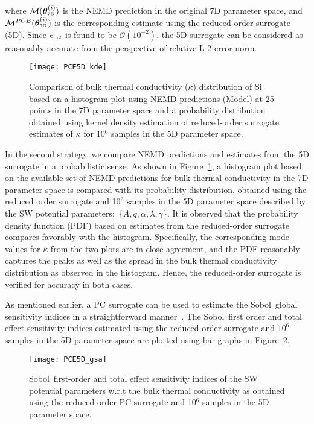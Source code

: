 \noindent where $\mathcal{M}(\bm{\theta}_{\mbox{\tiny{7D}}}^{(i)})$ is the NEMD prediction in the original 7D
parameter space, and $\mathcal{M}^{PCE}(\bm{\theta}_{\mbox{\tiny{5D}}}^{(i)})$ is the corresponding 
estimate using the reduced order surrogate (5D). 
Since $\epsilon_{\mbox{\tiny{L-2}}}$ is found to be $\mathcal{O}(10^{-2})$, the 5D surrogate can be considered as
reasonably accurate from the perspective of relative L-2 error norm. 

\begin{figure}[htbp]
 \begin{center}
  \texttt{[image: PCE5D\_kde]}
\caption{Comparison of bulk thermal conductivity ($\kappa$) distribution of Si based on a histogram plot
using NEMD predictions (Model) at 25 points in the 7D parameter space and a probability distribution obtained 
using kernel density estimation of  reduced-order surrogate estimates of $\kappa$ for 10$^6$ samples in the 5D
parameter space.}
\label{fig:verify}
\end{center}
\end{figure}

In the second strategy, we compare NEMD
predictions and estimates from the 5D surrogate in a probabilistic sense. As shown in Figure~\ref{fig:verify}, a 
histogram plot based on the available set of NEMD predictions for bulk thermal conductivity in the 7D parameter 
space is compared with its probability distribution, obtained using the reduced order surrogate and
10$^6$ samples in the 5D parameter space described by the SW potential parameters:~$\{A,q,\alpha,\lambda,\gamma\}$. It is observed that the probability density function (PDF) based on estimates from the reduced-order surrogate compares
favorably with the histogram. Specifically, the corresponding mode values for $\kappa$ from the two plots are
in close agreement, and the PDF reasonably captures the peaks as well as the spread in
the bulk thermal conductivity distribution as observed in the histogram. 
Hence, the reduced-order surrogate is verified for accuracy in both cases. 
\bigskip

As mentioned earlier, a PC surrogate can be used to estimate the Sobol\textquotesingle~global sensitivity indices in a 
straightforward manner~\cite{Sudret:2008}. The Sobol\textquotesingle~first order and total effect sensitivity indices estimated
using the reduced-order surrogate and $10^{6}$ samples in the 5D parameter space are plotted using bar-graphs in
Figure~\ref{fig:gsa}. 

\begin{figure}[htbp]
 \begin{center}
  \texttt{[image: PCE5D\_gsa]}
\caption{Sobol\textquotesingle~first-order and total effect sensitivity indices of the SW potential parameters
w.r.t the bulk thermal
conductivity as obtained using the reduced order PC surrogate and 10$^{6}$ samples in the 5D parameter space. }
\label{fig:gsa}
\end{center}
\end{figure}

